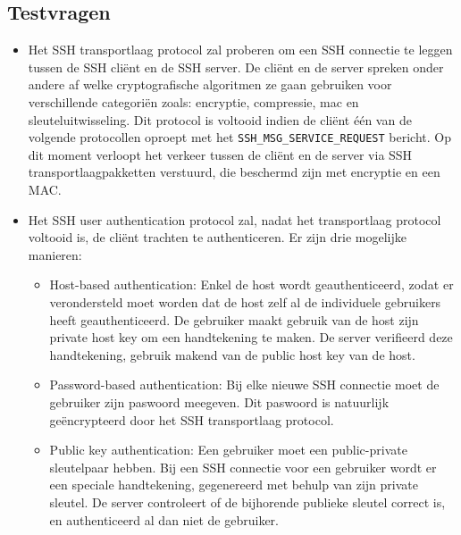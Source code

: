 \documentclass{report}
\begin{document}
	\subsection{Testvragen}
	\begin{enumerate}

{
		\begin{itemize}
			\item[\info] Het SSH transportlaag protocol zal proberen om een SSH connectie te leggen tussen de SSH cliënt en de SSH server. De cliënt en de server spreken onder andere af welke cryptografische algoritmen ze gaan gebruiken voor verschillende categoriën zoals: encryptie, compressie, mac en sleuteluitwisseling. Dit protocol is voltooid indien de cliënt één van de volgende protocollen oproept met het \texttt{SSH\_MSG\_SERVICE\_REQUEST} bericht. Op dit moment verloopt het verkeer tussen de cliënt en de server via SSH transportlaagpakketten verstuurd, die beschermd zijn met encryptie en een MAC.
			
			\item[\info] Het SSH user authentication protocol zal, nadat het transportlaag protocol voltooid is, de cliënt trachten te authenticeren. Er zijn drie mogelijke manieren:
			\begin{itemize}
				\item Host-based authentication: Enkel de host wordt geauthenticeerd, zodat er verondersteld moet worden dat de host zelf al de individuele gebruikers heeft geauthenticeerd. De gebruiker maakt gebruik van de host zijn private host key om een handtekening te maken. De server verifieerd deze handtekening, gebruik makend van de public host key van de host.
				\item Password-based authentication: Bij elke nieuwe SSH connectie moet de gebruiker zijn paswoord meegeven. Dit paswoord is natuurlijk geëncrypteerd door het SSH transportlaag protocol.
				\item Public key authentication: Een gebruiker moet een public-private sleutelpaar hebben. Bij een SSH connectie voor een gebruiker wordt er een speciale handtekening, gegenereerd met behulp van zijn private sleutel. De server controleert of de bijhorende publieke sleutel correct is, en authenticeerd al dan niet de gebruiker.
			\end{itemize}
		\end{itemize}
}
\end{enumerate}
\end{document}
